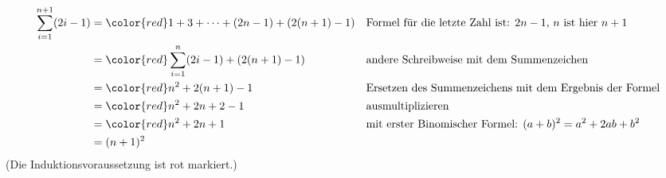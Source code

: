 \documentclass{lehramt-informatik-aufgabe}
\begin{document}
{\footnotesize
\begin{align*}
\sum^{n+1}_{i=1} (2i-1)
  &= {\color{red}1 + 3 + \cdots + (2n - 1)} + (2(n+1)-1) && \text{Formel für die letzte Zahl ist: } 2n - 1 \text{, } n \text{ ist hier } n + 1\\
  &= {\color{red} \sum^n_{i=1} (2i-1)} + (2(n+1)-1) && \text{andere Schreibweise mit dem Summenzeichen}\\
  &= {\color{red} n^2} + 2(n + 1) - 1 && \text{Ersetzen des Summenzeichens mit dem Ergebnis der Formel}\\
  &= {\color{red} n^2} + 2n + 2 - 1 && \text{ausmultiplizieren}\\
  &= {\color{red} n^2} + 2n + 1 && \text{mit erster Binomischer Formel: } (a+b)^{2}=a^{2}+2ab+b^{2} \\
  &= (n+1)^2
\end{align*}
}
(Die Induktionsvoraussetzung ist rot markiert.)
\end{document}
